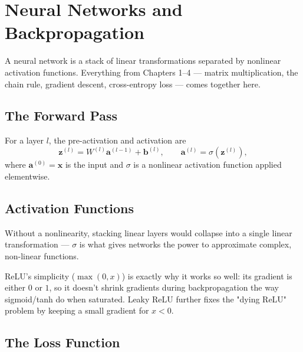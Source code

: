 \chapter{Neural Networks and Backpropagation}

A neural network is a stack of linear transformations separated by
nonlinear activation functions. Everything from Chapters 1–4 — matrix
multiplication, the chain rule, gradient descent, cross-entropy loss —
comes together here.

\section{The Forward Pass}

For a layer $l$, the pre-activation and activation are
\[
  \mathbf{z}^{(l)} = W^{(l)}\mathbf{a}^{(l-1)} + \mathbf{b}^{(l)},
  \qquad
  \mathbf{a}^{(l)} = \sigma\!\left(\mathbf{z}^{(l)}\right),
\]
where $\mathbf{a}^{(0)} = \mathbf{x}$ is the input and $\sigma$ is a
nonlinear activation function applied elementwise.


\section{Activation Functions}

Without a nonlinearity, stacking linear layers would collapse into a
single linear transformation — $\sigma$ is what gives networks the power
to approximate complex, non-linear functions.


\begin{keyidea}
ReLU's simplicity ($\max(0,x)$) is exactly why it works so well: its
gradient is either $0$ or $1$, so it doesn't shrink gradients during
backpropagation the way sigmoid/tanh do when saturated. Leaky ReLU further
fixes the "dying ReLU" problem by keeping a small gradient for $x<0$.
\end{keyidea}

\section{The Loss Function}

